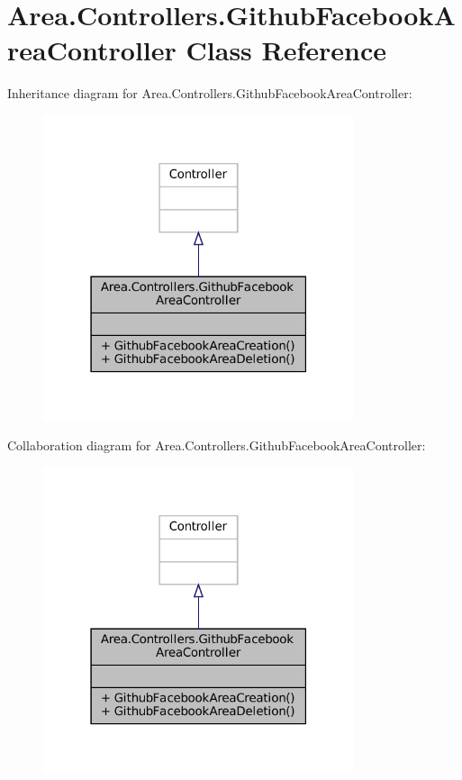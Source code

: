 \hypertarget{classArea_1_1Controllers_1_1GithubFacebookAreaController}{}\section{Area.\+Controllers.\+Github\+Facebook\+Area\+Controller Class Reference}
\label{classArea_1_1Controllers_1_1GithubFacebookAreaController}


Inheritance diagram for Area.\+Controllers.\+Github\+Facebook\+Area\+Controller\+:
\nopagebreak
\begin{figure}[H]
\begin{center}
\leavevmode
\includegraphics[width=259pt]{classArea_1_1Controllers_1_1GithubFacebookAreaController__inherit__graph}
\end{center}
\end{figure}


Collaboration diagram for Area.\+Controllers.\+Github\+Facebook\+Area\+Controller\+:
\nopagebreak
\begin{figure}[H]
\begin{center}
\leavevmode
\includegraphics[width=259pt]{classArea_1_1Controllers_1_1GithubFacebookAreaController__coll__graph}
\end{center}
\end{figure}
